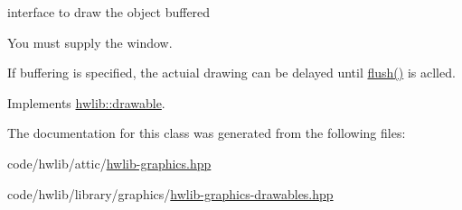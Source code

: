 interface to draw the object buffered 

You must supply the window.

If buffering is specified, the actuial drawing can be delayed until \hyperlink{namespacehwlib_a648fe94ca9899747a632c23f97007732}{flush()} is aclled. 

Implements \hyperlink{classhwlib_1_1drawable_ac9ea0de52a14d9024cb34110f794ac28}{hwlib\+::drawable}.



The documentation for this class was generated from the following files\+:\begin{DoxyCompactItemize}
\item 
code/hwlib/attic/\hyperlink{hwlib-graphics_8hpp}{hwlib-\/graphics.\+hpp}\item 
code/hwlib/library/graphics/\hyperlink{hwlib-graphics-drawables_8hpp}{hwlib-\/graphics-\/drawables.\+hpp}\end{DoxyCompactItemize}
